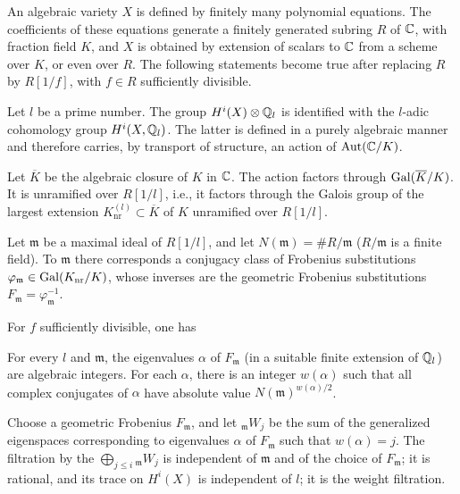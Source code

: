  An algebraic variety \(X\) is defined by finitely many polynomial equations. The coefficients of these equations generate a finitely generated subring \(R\) of \(\mathbb{C}\), with fraction field \(K\), and \(X\) is obtained by extension of scalars to \(\mathbb{C}\) from a scheme over \(K\), or even over \(R\). The following statements become true after replacing \(R\) by \(R[1/f]\), with \(f\in R\) sufficiently divisible.

 Let \(l\) be a prime number. The group \(H^i(X)\otimes\mathbb{Q}_l\) is identified with the \(l\)-adic cohomology group \(H^i(X,\mathbb{Q}_l)\). The latter is defined in a purely algebraic manner and therefore carries, by transport of structure, an action of \(\operatorname{Aut}(\mathbb{C}/K)\).

 Let \(\overline K\) be the algebraic closure of \(K\) in \(\mathbb{C}\). The action factors through \(\operatorname{Gal}(\overline K/K)\). It is unramified over \(R[1/l]\), i.e., it factors through the Galois group of the largest extension \(K_{\mathrm{nr}}^{(l)}\subset\overline K\) of \(K\) unramified over \(R[1/l]\).

 Let \(\mathfrak m\) be a maximal ideal of \(R[1/l]\), and let \(N(\mathfrak m)=\#R/\mathfrak m\) (\(R/\mathfrak m\) is a finite field). To \(\mathfrak m\) there corresponds a conjugacy class of Frobenius substitutions \(\varphi_{\mathfrak m}\in\operatorname{Gal}(K_{\mathrm{nr}}/K)\), whose inverses are the geometric Frobenius substitutions \(F_{\mathfrak m}=\varphi_{\mathfrak m}^{-1}\).

 For \(f\) sufficiently divisible, one has\EndTheorem
\EndSourcePage

\ReaderFont
{} For every \(l\) and \(\mathfrak m\), the eigenvalues \(\alpha\) of \(F_{\mathfrak m}\) (in a suitable finite extension of \(\mathbb{Q}_l\)) are algebraic integers. For each \(\alpha\), there is an integer \(w(\alpha)\) such that all complex conjugates of \(\alpha\) have absolute value \(N(\mathfrak m)^{w(\alpha)/2}\).

 Choose a geometric Frobenius \(F_{\mathfrak m}\), and let \({}_{\mathfrak m}W_j\) be the sum of the generalized eigenspaces corresponding to eigenvalues \(\alpha\) of \(F_{\mathfrak m}\) such that \(w(\alpha)=j\). The filtration by the \(\bigoplus_{j\le i}{}_{\mathfrak m}W_j\) is independent of \(\mathfrak m\) and of the choice of \(F_{\mathfrak m}\); it is rational, and its trace on \(H^i(X)\) is independent of \(l\); it is the weight filtration.\EndTheorem

